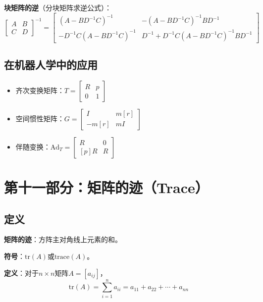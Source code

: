 \documentclass[12pt,a4paper]{article}
\begin{document}
\textbf{块矩阵的逆}（分块矩阵求逆公式）：
\begin{equation}
\begin{bmatrix} A & B \\ C & D \end{bmatrix}^{-1} = \begin{bmatrix} (A - BD^{-1}C)^{-1} & -(A - BD^{-1}C)^{-1}BD^{-1} \\ -D^{-1}C(A - BD^{-1}C)^{-1} & D^{-1} + D^{-1}C(A - BD^{-1}C)^{-1}BD^{-1} \end{bmatrix}
\end{equation}

\subsection{在机器人学中的应用}

\begin{itemize}
\item 齐次变换矩阵：$T = \begin{bmatrix} R & p \\ 0 & 1 \end{bmatrix}$
\item 空间惯性矩阵：$G = \begin{bmatrix} I & m[r] \\ -m[r] & mI \end{bmatrix}$
\item 伴随变换：$\text{Ad}_T = \begin{bmatrix} R & 0 \\ [p]R & R \end{bmatrix}$
\end{itemize}

\section{第十一部分：矩阵的迹（Trace）}

\subsection{定义}

\textbf{矩阵的迹}：方阵主对角线上元素的和。

\textbf{符号}：$\text{tr}(A)$或$\text{trace}(A)$。

\textbf{定义}：对于$n \times n$矩阵$A = [a_{ij}]$，
\begin{equation}
\text{tr}(A) = \sum_{i=1}^n a_{ii} = a_{11} + a_{22} + \cdots + a_{nn}
\end{equation}
\end{document}
